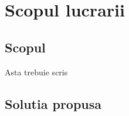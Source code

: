 \section{Scopul lucrarii}

\subsection{Scopul}

\quad Asta trebuie scris

\subsection{Solutia propusa}


